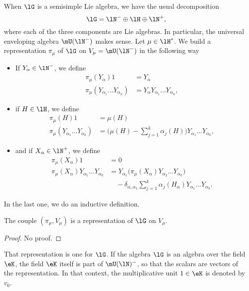 When $\lG$ is a semisimple Lie algebra, we have the usual decomposition\cite{VermaPiercey}
\begin{equation}
    \lG=\lN^-\oplus\lH\oplus\lN^+,
\end{equation}
where each of the three components are Lie algebras. In particular, the universal enveloping algebra $\mU(\lN^-)$ makes sense. Let $\mu\in\lH^*$. We build a representation $\pi_{\mu}$ of $\lG$ on $V_{\mu}=\mU(\lN^-)$ in the following way
\begin{itemize}
\item If $Y_{\alpha}\in\lN^-$, we define
\begin{subequations}
    \begin{align}
        \pi_{\mu}(Y_{\alpha})1  &=Y_{\alpha}\\
        \pi_{\mu}(Y_{\alpha_1}\ldots Y_{\alpha_n})&=Y_{\alpha}Y_{\alpha_1}\ldots Y_{\alpha_n},
    \end{align}
\end{subequations}
\item if $H\in\lH$, we define
\begin{subequations}
    \begin{align}
        \pi_{\mu}(H)1   &=\mu(H)\\
        \pi_{\mu}(Y_{\alpha_1}\ldots Y_{\alpha_k})  &= \big( \mu(H)-\sum_{j=1}^k\alpha_j(H) \big)Y_{\alpha_1}\ldots Y_{\alpha_k},
    \end{align}
\end{subequations}
\item and if $X_{\alpha}\in\lN^+$, we define
\begin{subequations}
    \begin{align}
        \pi_{\mu}(X_{\alpha})1  &=0\\
        \pi_{\mu}(X_{\alpha})Y_{\alpha_1}\ldots Y_{\alpha_k}    &=Y_{\alpha_1}\big( \pi_{\mu}(X_{\alpha})Y_{\alpha_2}\ldots Y_{\alpha_k} \big)\\
                                    &\quad  -\delta_{\alpha,\alpha_1}\sum_{j=1}^k\alpha_j(H_{\alpha})Y_{\alpha_1}\ldots Y_{\alpha_k}.
    \end{align}
\end{subequations}
\end{itemize}
In the last one, we do an inductive definition.
\begin{lemma}
The couple $(\pi_{\mu},V_{\mu})$ is a representation of $\lG$ on $V_{\mu}$.
\end{lemma}
\begin{proof}
    No proof.
\end{proof}
That representation is one  for $\lG$. If the algebra $\lG$ is an algebra over the field $\eK$, the field $\eK$ itself is part of $\mU(\lN)^-$, so that the scalars are vectors of the representation. In that context, the multiplicative unit $1\in \eK$ is denoted by $v_0$.

